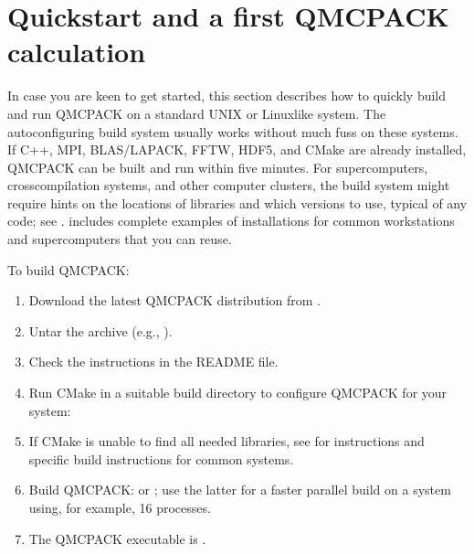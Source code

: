 \documentclass[letterpaper,10pt,english]{sphinxmanual}
\begin{document}
\section{Quickstart and a first QMCPACK calculation}
\label{\detokenize{introduction:quickstart-and-a-first-qmcpack-calculation}}
In case you are keen to get started, this section describes how to
quickly build and run QMCPACK on a standard UNIX or Linux\sphinxhyphen{}like system.
The autoconfiguring build system usually works without much fuss on
these systems. If C++, MPI, BLAS/LAPACK, FFTW, HDF5, and CMake are
already installed, QMCPACK can be built and run within five minutes. For
supercomputers, cross\sphinxhyphen{}compilation systems, and other computer clusters,
the build system might require hints on the locations of libraries and
which versions to use, typical of any code; see
{\hyperref[\detokenize{installation:obtaininginstalling}]{}}.
{\hyperref[\detokenize{installation:installexamples}]{}} includes
complete examples of installations for common workstations and
supercomputers that you can reuse.

To build QMCPACK:
\begin{enumerate}
%
\item {} 
Download the latest QMCPACK distribution from .

\item {} 
Untar the archive (e.g., ).

\item {} 
Check the instructions in the README file.

\item {} 
Run CMake in a suitable build directory to configure QMCPACK for your
system: 

\item {} 
If CMake is unable to find all needed libraries, see
{\hyperref[\detokenize{installation:obtaininginstalling}]{}} for
instructions and specific build instructions for common systems.

\item {} 
Build QMCPACK:  or ; use the latter for a faster parallel build on a
system using, for example, 16 processes.

\item {} 
The QMCPACK executable is .

\end{enumerate}
\end{document}

